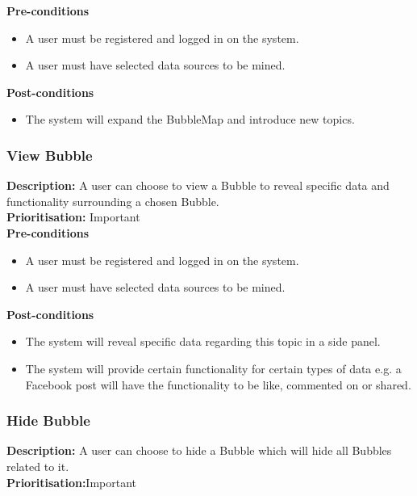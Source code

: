 \documentclass[hidelinks,english]{article}
\begin{document}
    
      \textbf{Pre-conditions}
    \begin{itemize}
        \item A user must be registered and logged in on the system.
        \item A user must have selected data sources to be mined.
    \end{itemize}
    
    \textbf{Post-conditions}
     \begin{itemize}
        \item The system will expand the BubbleMap and introduce new topics.
    \end{itemize}
    
     \subsubsection{View Bubble}
	\textbf{Description:}  A user can choose to view a Bubble to reveal specific data and functionality surrounding a chosen Bubble.
	\\
    \textbf{Prioritisation:} Important\\
    
    
      \textbf{Pre-conditions}
    \begin{itemize}
        \item A user must be registered and logged in on the system.
        \item A user must have selected data sources to be mined.
    \end{itemize}
    
    \textbf{Post-conditions}
     \begin{itemize}
        \item The system will reveal specific data regarding this topic in a side panel.
        \item The system will provide certain functionality for certain types of data e.g. a Facebook post will have the functionality to be like, commented on or shared.
    \end{itemize}
    
    \subsubsection{Hide Bubble}
	\textbf{Description:}  A user can choose to hide a Bubble which will hide all Bubbles related to it.
	\\
    \textbf{Prioritisation:}Important\\
    
\end{document}

